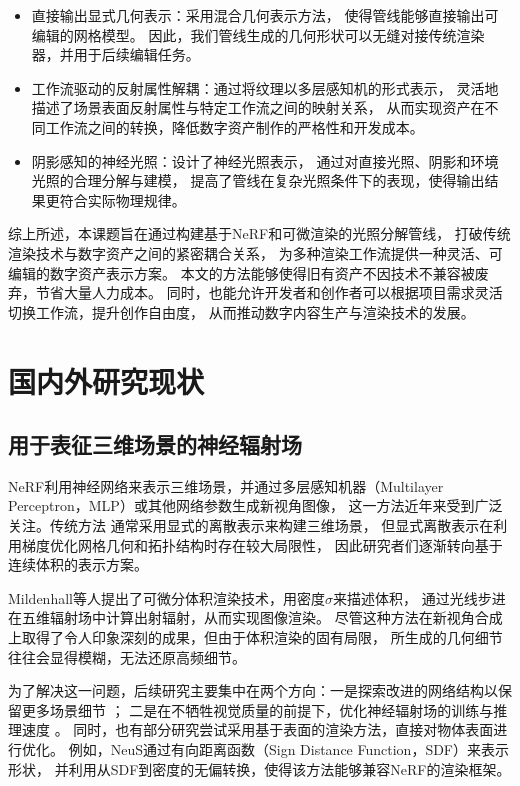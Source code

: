 \begin{itemize}
  \item 直接输出显式几何表示：采用混合几何表示方法，
  使得管线能够直接输出可编辑的网格模型。
  因此，我们管线生成的几何形状可以无缝对接传统渲染器，并用于后续编辑任务。
  \item 工作流驱动的反射属性解耦：通过将纹理以多层感知机的形式表示，
  灵活地描述了场景表面反射属性与特定工作流之间的映射关系，
  从而实现资产在不同工作流之间的转换，降低数字资产制作的严格性和开发成本。
  \item 阴影感知的神经光照：设计了神经光照表示，
  通过对直接光照、阴影和环境光照的合理分解与建模，
  提高了管线在复杂光照条件下的表现，使得输出结果更符合实际物理规律。
\end{itemize}

综上所述，本课题旨在通过构建基于NeRF和可微渲染的光照分解管线，
打破传统渲染技术与数字资产之间的紧密耦合关系，
为多种渲染工作流提供一种灵活、可编辑的数字资产表示方案。
本文的方法能够使得旧有资产不因技术不兼容被废弃，节省大量人力成本。
同时，也能允许开发者和创作者可以根据项目需求灵活切换工作流，提升创作自由度，
从而推动数字内容生产与渲染技术的发展。



\section{国内外研究现状}
\subsection{用于表征三维场景的神经辐射场}
NeRF利用神经网络来表示三维场景，并通过多层感知机器（Multilayer Perceptron，MLP）或其他网络参数生成新视角图像，
这一方法近年来受到广泛关注。传统方法
\cite{Waechter_2014, Mildenhall_2019, wu2020adversarial, Aliev_2020, Dai_2015}
通常采用显式的离散表示来构建三维场景，
但显式离散表示在利用梯度优化网格几何和拓扑结构时存在较大局限性，
因此研究者们逐渐转向基于连续体积的表示方案。

Mildenhall等人\cite{Mildenhall_2020}提出了可微分体积渲染技术，用密度$\sigma$来描述体积，
通过光线步进在五维辐射场中计算出射辐射，从而实现图像渲染。
尽管这种方法在新视角合成上取得了令人印象深刻的成果，但由于体积渲染的固有局限，
所生成的几何细节往往会显得模糊，无法还原高频细节。

为了解决这一问题，后续研究主要集中在两个方向：一是探索改进的网络结构以保留更多场景细节
\cite{Chen_2022,Barron_2021,Barron_2022,dave2022pandora}；
二是在不牺牲视觉质量的前提下，优化神经辐射场的训练与推理速度
\cite{Reiser_2021,Martin_Brualla_2021}。
同时，也有部分研究尝试采用基于表面的渲染方法，直接对物体表面进行优化。
例如，NeuS\cite{10.5555/3540261.3542342}通过有向距离函数（Sign Distance Function，SDF）来表示形状，
并利用从SDF到密度的无偏转换，使得该方法能够兼容NeRF的渲染框架。

